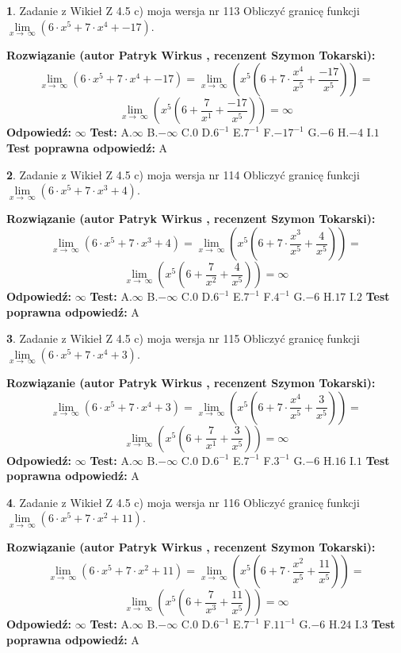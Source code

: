 \documentclass[12pt, a4paper]{article}
\theoremstyle{definition} %
\newtheorem{zad}{}
\newcommand{\zadStart}[1]{\begin{zad}#1\newline}
\newcommand{\zadStop}{\end{zad}}
\newcommand{\rozwStart}[2]{\noindent \textbf{Rozwiązanie (autor #1 , recenzent #2): }\newline}
\newcommand{\rozwStop}{\newline}
\newcommand{\odpStart}{\noindent \textbf{Odpowiedź:}\newline}
\newcommand{\odpStop}{\newline}
\newcommand{\testStart}{\noindent \textbf{Test:}\newline}
\newcommand{\testStop}{\newline}
\newcommand{\kluczStart}{\noindent \textbf{Test poprawna odpowiedź:}\newline}
\newcommand{\kluczStop}{\newline}
\begin{document}
\zadStart{Zadanie z Wikieł Z 4.5 c) moja wersja nr 113}
Obliczyć granicę funkcji  $\lim\limits_{x\to\ \infty}(6 \cdot x^{5}+7 \cdot x^{4}+-17)$.
\zadStop
\rozwStart{Patryk Wirkus}{Szymon Tokarski}
$$\lim\limits_{x\to\ \infty}(6 \cdot x^{5}+7 \cdot x^{4}+-17) = \lim\limits_{x\to\ \infty}(x^{5}(6 +7 \cdot \frac{x^{4}}{x^{5}}+\frac{-17}{x^{5}})) =$$ $$\lim\limits_{x\to\ \infty}(x^{5}(6 +\frac{7}{x^{1}}+\frac{-17}{x^{5}})) =\infty$$
\rozwStop
\odpStart
$\infty$
\odpStop
\testStart
A.$\infty$ B.$-\infty$ C.$0$ D.$6^{-1}$ E.$7^{-1}$
F.$-17^{-1}$ G.$-6$
H.$-4$
I.$1$
\testStop
\kluczStart
A
\kluczStop



\zadStart{Zadanie z Wikieł Z 4.5 c) moja wersja nr 114}
Obliczyć granicę funkcji  $\lim\limits_{x\to\ \infty}(6 \cdot x^{5}+7 \cdot x^{3}+4)$.
\zadStop
\rozwStart{Patryk Wirkus}{Szymon Tokarski}
$$\lim\limits_{x\to\ \infty}(6 \cdot x^{5}+7 \cdot x^{3}+4) = \lim\limits_{x\to\ \infty}(x^{5}(6 +7 \cdot \frac{x^{3}}{x^{5}}+\frac{4}{x^{5}})) =$$ $$\lim\limits_{x\to\ \infty}(x^{5}(6 +\frac{7}{x^{2}}+\frac{4}{x^{5}})) =\infty$$
\rozwStop
\odpStart
$\infty$
\odpStop
\testStart
A.$\infty$ B.$-\infty$ C.$0$ D.$6^{-1}$ E.$7^{-1}$
F.$4^{-1}$ G.$-6$
H.$17$
I.$2$
\testStop
\kluczStart
A
\kluczStop



\zadStart{Zadanie z Wikieł Z 4.5 c) moja wersja nr 115}
Obliczyć granicę funkcji  $\lim\limits_{x\to\ \infty}(6 \cdot x^{5}+7 \cdot x^{4}+3)$.
\zadStop
\rozwStart{Patryk Wirkus}{Szymon Tokarski}
$$\lim\limits_{x\to\ \infty}(6 \cdot x^{5}+7 \cdot x^{4}+3) = \lim\limits_{x\to\ \infty}(x^{5}(6 +7 \cdot \frac{x^{4}}{x^{5}}+\frac{3}{x^{5}})) =$$ $$\lim\limits_{x\to\ \infty}(x^{5}(6 +\frac{7}{x^{1}}+\frac{3}{x^{5}})) =\infty$$
\rozwStop
\odpStart
$\infty$
\odpStop
\testStart
A.$\infty$ B.$-\infty$ C.$0$ D.$6^{-1}$ E.$7^{-1}$
F.$3^{-1}$ G.$-6$
H.$16$
I.$1$
\testStop
\kluczStart
A
\kluczStop



\zadStart{Zadanie z Wikieł Z 4.5 c) moja wersja nr 116}
Obliczyć granicę funkcji  $\lim\limits_{x\to\ \infty}(6 \cdot x^{5}+7 \cdot x^{2}+11)$.
\zadStop
\rozwStart{Patryk Wirkus}{Szymon Tokarski}
$$\lim\limits_{x\to\ \infty}(6 \cdot x^{5}+7 \cdot x^{2}+11) = \lim\limits_{x\to\ \infty}(x^{5}(6 +7 \cdot \frac{x^{2}}{x^{5}}+\frac{11}{x^{5}})) =$$ $$\lim\limits_{x\to\ \infty}(x^{5}(6 +\frac{7}{x^{3}}+\frac{11}{x^{5}})) =\infty$$
\rozwStop
\odpStart
$\infty$
\odpStop
\testStart
A.$\infty$ B.$-\infty$ C.$0$ D.$6^{-1}$ E.$7^{-1}$
F.$11^{-1}$ G.$-6$
H.$24$
I.$3$
\testStop
\kluczStart
A
\kluczStop
\end{document}
